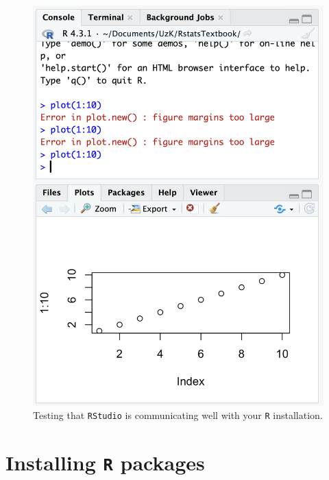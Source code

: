 \documentclass[
  letterpaper,
  DIV=11,
  numbers=noendperiod]{scrreprt}
\begin{document}
\begin{figure}
\begin{minipage}{0.50\linewidth}
{\includegraphics{images/TestplotRStudio.png}

}


\end{minipage}%

\caption{\label{fig-testingRStudio}Testing that \texttt{RStudio} is
communicating well with your \texttt{R} installation.}

\end{figure}%

\section{\texorpdfstring{Installing \texttt{R}
packages}{Installing R packages}}\label{installing-r-packages}
\end{document}
